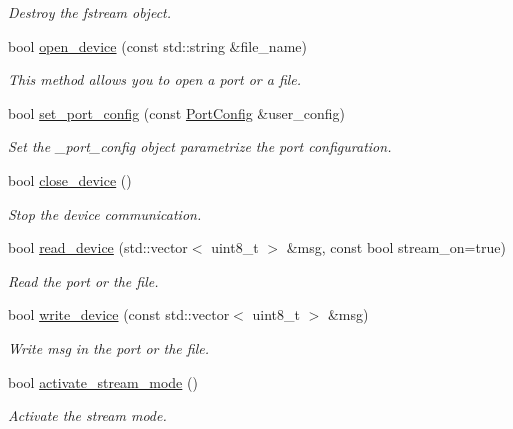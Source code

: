 \begin{DoxyCompactItemize}
\begin{DoxyCompactList}\small\item\em Destroy the fstream object. \end{DoxyCompactList}\item 
bool \hyperlink{classreal__time__tools_1_1UsbStream_a1f6915c42d9742ced10e99d2edf7d8b1}{open\+\_\+device} (const std\+::string \&file\+\_\+name)
\begin{DoxyCompactList}\small\item\em This method allows you to open a port or a file. \end{DoxyCompactList}\item 
bool \hyperlink{classreal__time__tools_1_1UsbStream_adb0c41dc7a9603022a0a1e19c9ab8292}{set\+\_\+port\+\_\+config} (const \hyperlink{classreal__time__tools_1_1PortConfig}{Port\+Config} \&user\+\_\+config)
\begin{DoxyCompactList}\small\item\em Set the \+\_\+port\+\_\+config object parametrize the port configuration. \end{DoxyCompactList}\item 
bool \hyperlink{classreal__time__tools_1_1UsbStream_acea75055bb37f2a7f351300dbaf28d9e}{close\+\_\+device} ()
\begin{DoxyCompactList}\small\item\em Stop the device communication. \end{DoxyCompactList}\item 
bool \hyperlink{classreal__time__tools_1_1UsbStream_a028f39fcd8c97c49aacf48fdaa8302c8}{read\+\_\+device} (std\+::vector$<$ uint8\+\_\+t $>$ \&msg, const bool stream\+\_\+on=true)
\begin{DoxyCompactList}\small\item\em Read the port or the file. \end{DoxyCompactList}\item 
bool \hyperlink{classreal__time__tools_1_1UsbStream_aa9fdd0d43fbf0cddbffb65538af60321}{write\+\_\+device} (const std\+::vector$<$ uint8\+\_\+t $>$ \&msg)
\begin{DoxyCompactList}\small\item\em Write msg in the port or the file. \end{DoxyCompactList}\item 
bool \hyperlink{classreal__time__tools_1_1UsbStream_a6e13bacd3b24a8e60b27cbcefefdb3f4}{activate\+\_\+stream\+\_\+mode} ()
\begin{DoxyCompactList}\small\item\em Activate the stream mode. \end{DoxyCompactList}\item 

\end{DoxyCompactItemize}
